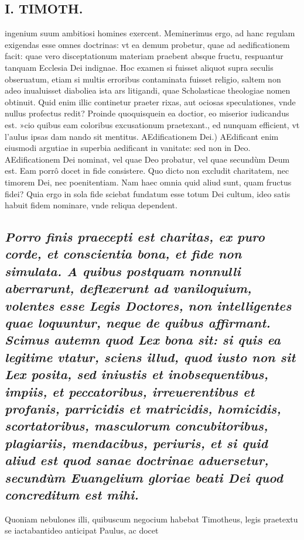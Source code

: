 \documentclass{article}
\begin{document}
\begin{pages}
\section*{I. TIMOTH. }
\marginpar{[ p.4 ]}\pstart ingenium suum ambitiosi homines exercent. Meminerimus ergo, ad hanc regulam exigendas esse omnes doctrinas: vt ea demum probetur, quae ad aedificationem facit: quae vero disceptationum materiam praebent absque fructu, respuantur tanquam Ecclesia Dei indignae. Hoc examen si fuisset aliquot supra seculis obseruatum, etiam si multis erroribus contaminata fuisset religio, saltem non adeo inualuisset diaboliea ista ars litigandi, quae Scholasticae theologiae nomen obtinuit. Quid enim illic continetur praeter rixas, aut ociosas speculationes, vnde nullus profectus redit? Proinde quoquisquein ea doctior, eo miserior iudicandus est. »cio quibus eam coloribus excusationum praetexant., ed nunquam efficient, vt l'aulus ipsas dam nando sit mentitus.  \pend\pstart AEdificationem Dei.) AEdificant enim eiusmodi argutiae in superbia aedificant in vanitate: sed non in Deo. AEdificationem Dei nominat, vel quae Deo probatur, vel quae secundùm Deum est. Eam porrô docet in fide consistere. Quo dicto non excludit charitatem, nec timorem Dei, nec poenitentiam. Nam haec omnia quid aliud sunt, quam fructus fidei? Quia ergo in sola fide sciebat fundatum esse totum Dei cultum, ideo satis habuit fidem nominare, vnde reliqua dependent.  \pend
{}
{}
\subsection*{\textit{Porro finis praecepti est charitas, ex puro corde, et conscientia bona, et fide non simulata. A quibus postquam nonnulli aberrarunt, deflexerunt ad vaniloquium, volentes esse Legis Doctores, non intelligentes quae loquuntur, neque de quibus affirmant. Scimus autemn quod Lex bona sit: si quis ea legitime vtatur, sciens illud, quod iusto non sit Lex posita, sed iniustis et inobsequentibus, impiis, et peccatoribus, irreuerentibus et profanis, parricidis et matricidis, homicidis, scortatoribus, masculorum concubitoribus, plagiariis, mendacibus, periuris, et si quid aliud est quod sanae doctrinae aduersetur, secundùm Euangelium gloriae beati Dei quod concreditum est mihi. }}\pstart Quoniam nebulones illi, quibuscum negocium habebat Timotheus, legis praetextu se iactabantideo anticipat Paulus, ac docet  \pend

\end{pages}
\end{document}
